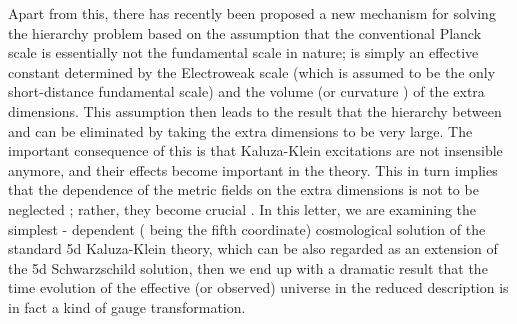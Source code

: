 \documentclass[a4paper,12pt]{article}
\begin{document}
Apart from this, there has recently been proposed a new mechanism
\cite{ark} for solving the hierarchy problem based on the
assumption that the conventional Planck scale \coordHE{} is essentially not the fundamental scale in nature;
\coordHE{} is simply an effective constant determined by the
Electroweak scale \coordHE{}(which is assumed to be the only
short-distance fundamental scale) and the volume (or curvature
\cite{ran}) of the extra dimensions. This assumption then leads to
the result that the hierarchy between \coordHE{} and \coordHE{} can be
eliminated by taking the extra dimensions to be very large. The
important consequence of this is that Kaluza-Klein excitations are
not insensible anymore, and their effects become important in the
theory. This in turn implies that the dependence of the metric
fields on the extra dimensions is not to be neglected ; rather,
they become crucial \cite{gid}. In this letter, we are examining
the simplest \coordHE{}- dependent (\coordHE{} being the fifth coordinate)
cosmological solution of the standard 5d
 Kaluza-Klein theory, which can be also regarded as an extension
of the 5d Schwarzschild solution, then we end up with a dramatic
result that the time evolution of the effective (or observed)
universe in the reduced description is in fact a kind of gauge
transformation.
\end{document}
